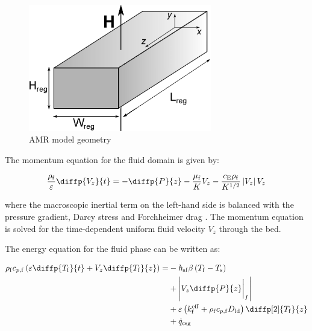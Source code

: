 \documentclass[referee]{svjour3}
\begin{document}

\begin{figure}[!ht]
  \centering
  \includegraphics[width=8cm]{reg3d}
  \caption{AMR model geometry}
  \label{fig:amrmodel}
\end{figure}

The momentum equation for the fluid domain is given by:

\begin{equation}
\label{eq:75}
  \frac{\rho\ped{f}}{\varepsilon} \diffp{V_z}{t}= -\diffp{P}{z} - \frac{\mu\ped{f}}{K} V_z - \frac{c\ped{E} \rho\ped{f}}{K^{1/2}} \left| V_z\right| V_z 
\end{equation}



\noindent where the macroscopic inertial term on the left-hand side is balanced with the pressure gradient, Darcy stress and Forchheimer drag \cite{bib:nield06_convec_porous_media}. The momentum equation is solved for the time-dependent uniform fluid velocity $V_z$ through the bed. 

The energy equation for the fluid phase can be written as:

\begin{equation}
\label{eq:78}
\begin{split}
  \rho\ped{f} c_{p,\mathrm{f}} \left(\varepsilon \diffp{T\ped{f}}{t} + V_z\diffp{T\ped{f}}{z}\right) = & -\hheat\ped{sf} \beta \left(T\ped{f} - T\ped{s}\right) \\
& + \left|V_z\diffp{P}{z}\bigg|_f \right| \\
& + \varepsilon\left(k\ped{f}\ap{eff}  +\rho\ped{f} c_{p,\mathrm{f}} D\ped{ld}\right)\diffp[2]{T\ped{f}}{z} \\
& + \rate{q}\ped{csg}  
\end{split}
\end{equation}
\end{document}
